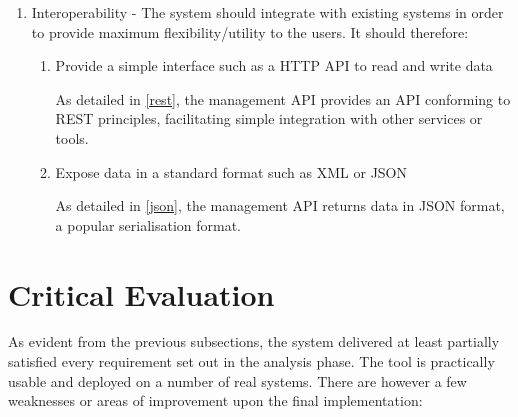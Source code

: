\documentclass{cshonours}
\begin{document}
\begin{enumerate}
\begin{enumerate}
    \end{enumerate}
  \item Interoperability - The system should integrate with existing systems in order to provide maximum flexibility/utility to the users. It should therefore:
    \begin{enumerate}
      \item Provide a simple interface such as a HTTP API to read and write data

        As detailed in \autoref{rest}, the management API provides an API conforming to REST principles, facilitating simple integration with other services or tools.

      \item Expose data in a standard format such as XML or JSON

        As detailed in \autoref{json}, the management API returns data in JSON format, a popular serialisation format.

    \end{enumerate}
\end{enumerate}

\section{Critical Evaluation}

As evident from the previous subsections, the system delivered at least partially satisfied every requirement set out in the analysis phase. The tool is practically usable and deployed on a number of real systems. There are however a few weaknesses or areas of improvement upon the final implementation:
\end{document}

